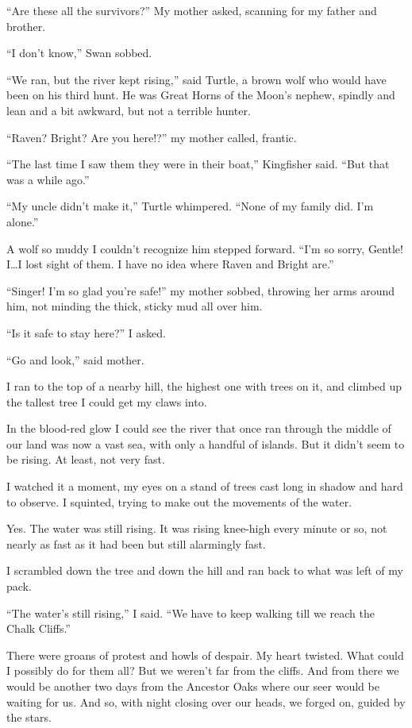 ``Are these all the survivors?'' My mother asked, scanning for my father and brother.

``I don't know,'' Swan sobbed.

``We ran, but the river kept rising,'' said Turtle, a brown wolf who would have been on his third hunt. He was Great Horns of the Moon's nephew, spindly and lean and a bit awkward, but not a terrible hunter.

``Raven? Bright? Are you here!?'' my mother called, frantic.

``The last time I saw them they were in their boat,'' Kingfisher said. ``But that was a while ago.''

``My uncle didn't make it,'' Turtle whimpered. ``None of my family did. I'm alone.''

A wolf so muddy I couldn't recognize him stepped forward. ``I'm so sorry, Gentle! I\ldots{}I lost sight of them. I have no idea where Raven and Bright are.''

``Singer! I'm so glad you're safe!'' my mother sobbed, throwing her arms around him, not minding the thick, sticky mud all over him.

``Is it safe to stay here?'' I asked.

``Go and look,'' said mother.

I ran to the top of a nearby hill, the highest one with trees on it, and climbed up the tallest tree I could get my claws into.

In the blood-red glow I could see the river that once ran through the middle of our land was now a vast sea, with only a handful of islands. But it didn't seem to be rising. At least, not very fast.

I watched it a moment, my eyes on a stand of trees cast long in shadow and hard to observe. I squinted, trying to make out the movements of the water.

Yes. The water was still rising. It was rising knee-high every minute or so, not nearly as fast as it had been but still alarmingly fast.

I scrambled down the tree and down the hill and ran back to what was left of my pack.

``The water's still rising,'' I said. ``We have to keep walking till we reach the Chalk Cliffs.''

There were groans of protest and howls of despair. My heart twisted. What could I possibly do for them all? But we weren't far from the cliffs. And from there we would be another two days from the Ancestor Oaks where our seer would be waiting for us. And so, with night closing over our heads, we forged on, guided by the stars.

